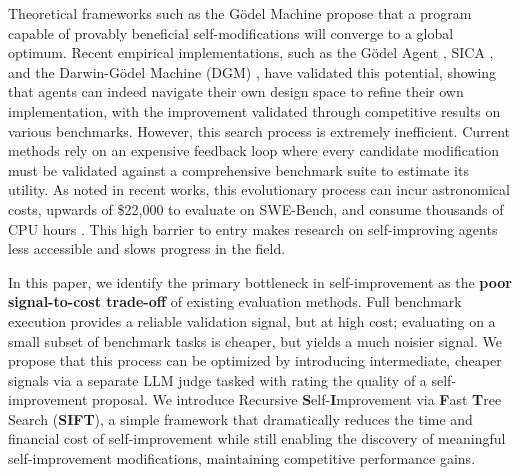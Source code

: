 \documentclass{article}
\begin{document}
Theoretical frameworks such as the G\"odel Machine \citep{godelmachine} propose that a program capable of provably beneficial self-modifications will converge to a global optimum. Recent empirical implementations, such as the G\"odel Agent \citep{godelagent}, SICA \citep{sica}, and the Darwin-G\"odel Machine (DGM) \citep{dgm}, have validated this potential, showing that agents can indeed navigate their own design space to refine their own implementation, with the improvement validated through competitive results on various benchmarks. However, this search process is extremely inefficient. Current methods rely on an expensive feedback loop where every candidate modification must be validated against a comprehensive benchmark suite to estimate its utility. As noted in recent works, this evolutionary process can incur astronomical costs, upwards of \$22,000 to evaluate on SWE-Bench, and consume thousands of CPU hours \citep{dgm, hgm}. 
This high barrier to entry makes research on self-improving agents less accessible and slows progress in the field.

In this paper, we identify the primary bottleneck in self-improvement as the \textbf{poor signal-to-cost trade-off} of existing evaluation methods. 
Full benchmark execution provides a reliable validation signal, but at high cost; evaluating on a small subset of benchmark tasks is cheaper, but yields a much noisier signal.
We propose that this process can be optimized by introducing intermediate, cheaper signals via a separate LLM judge tasked with rating the quality of a self-improvement proposal. We introduce Recursive \textbf{S}elf-\textbf{I}mprovement via \textbf{F}ast \textbf{T}ree Search (\textbf{SIFT}), a simple framework that dramatically reduces the time and financial cost of self-improvement while still enabling the discovery of meaningful self-improvement modifications, maintaining competitive performance gains.
\end{document}
